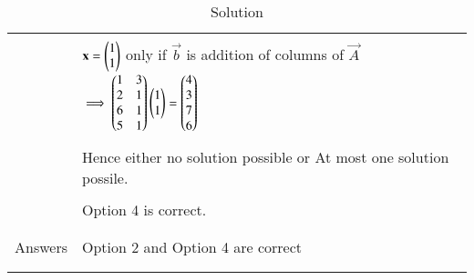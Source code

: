 \documentclass[journal,12pt]{IEEEtran}
\begin{document}
\begin{longtable}{|l|l|}
&\\
&$\mathbf{x}=\begin{pmatrix}1\\1\end{pmatrix}$ only if $\vec{b}$ is addition of columns of $\vec{A}$ $\implies \begin{pmatrix}1&3\\2&1\\6&1\\5&1\end{pmatrix}\begin{pmatrix}1\\1\end{pmatrix}=\begin{pmatrix}4\\3\\7\\6\end{pmatrix}$\\
&\\
&Hence either no solution possible or At most one solution possile.\\
&\\
&Option 4 is correct.\\
&\\
\hline
&\\
Answers & Option 2 and Option 4 are correct\\
&\\
\hline
\caption{Solution}
\label{table:1}
\end{longtable}
\end{document}
